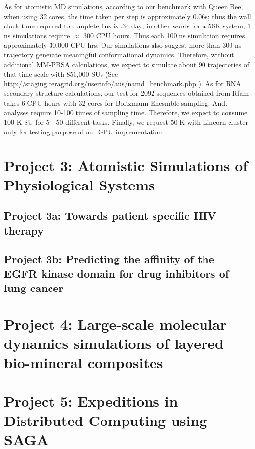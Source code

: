 \documentclass[a4paper,10pt]{article}
\begin{document}
As for atomistic MD simulations, according to our benchmark with Queen Bee, when using 32 cores, the time taken per step is approximately 0.06s; thus the wall clock time required to complete 1ns is .34 day; in other words for a 56K system, 1 ns simulations require $\approx$ 300 CPU hours.  Thus each 100 ns simulation requires approximately 30,000 CPU hrs.  Our simulations also suggest more than 300 ns trajectory generate meaningful conformational dynamics. Therefore, without additional MM-PBSA calculations, we expect to simulate about 90 trajectories of that time scale with 850,000 SUs (See {\url{http://staging.teragrid.org/userinfo/aus/namd_benchmark.php}} ).  As for RNA secondary structure calculations, our test for 2092 sequences obtained from Rfam takes 6 CPU hours with 32 cores for Boltzmann Enesmble sampling.  And, analyses require 10-100 times of sampling time.  Therefore, we expect to consume 100 K SU for 5 - 50 different tasks. Finally, we request 50 K with Lincorn cluster only for testing purpose of our GPU implementation.  



\section*{Project 3: Atomistic Simulations of Physiological Systems}

\subsection*{Project 3a: Towards patient specific HIV therapy}


\subsection*{Project 3b: Predicting the affinity of the EGFR kinase domain for drug inhibitors of lung cancer}



\section*{Project 4: Large-scale molecular dynamics simulations of layered bio-mineral composites}
 


\section*{Project 5: Expeditions in Distributed Computing using SAGA}
\end{document}
